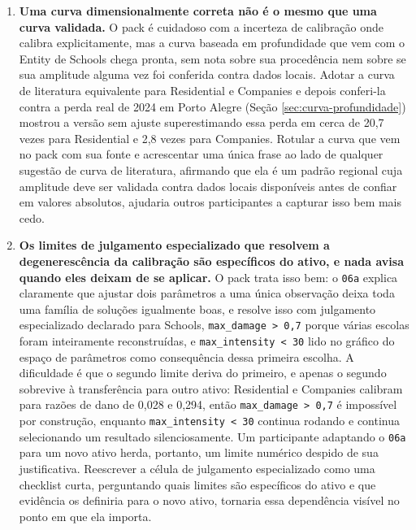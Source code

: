 \documentclass[11pt]{article}
\begin{document}
\begin{enumerate}
\item \textbf{Uma curva dimensionalmente correta não é o mesmo que uma curva validada.} O
pack é cuidadoso com a incerteza de calibração onde calibra explicitamente, mas a curva
baseada em profundidade que vem com o Entity de Schools chega pronta, sem nota sobre sua
procedência nem sobre se sua amplitude alguma vez foi conferida contra dados locais. Adotar
a curva de literatura equivalente para Residential e Companies e depois conferi-la contra a
perda real de 2024 em Porto Alegre (Seção \ref{sec:curva-profundidade}) mostrou a versão
sem ajuste superestimando essa perda em cerca de 20,7 vezes para Residential e 2,8 vezes
para Companies. Rotular a curva que vem no pack com sua fonte e acrescentar uma única frase
ao lado de qualquer sugestão de curva de literatura, afirmando que ela é um padrão regional
cuja amplitude deve ser validada contra dados locais disponíveis antes de confiar em
valores absolutos, ajudaria outros participantes a capturar isso bem mais cedo.

\item \textbf{Os limites de julgamento especializado que resolvem a degenerescência da
calibração são específicos do ativo, e nada avisa quando eles deixam de se aplicar.} O pack
trata isso bem: o \texttt{06a} explica claramente que ajustar dois parâmetros a uma única
observação deixa toda uma família de soluções igualmente boas, e resolve isso com
julgamento especializado declarado para Schools, \texttt{max\_damage > 0,7} porque várias
escolas foram inteiramente reconstruídas, e \texttt{max\_intensity < 30} lido no gráfico do
espaço de parâmetros como consequência dessa primeira escolha. A dificuldade é que o
segundo limite deriva do primeiro, e apenas o segundo sobrevive à transferência para outro
ativo: Residential e Companies calibram para razões de dano de 0,028 e 0,294, então
\texttt{max\_damage > 0,7} é impossível por construção, enquanto \texttt{max\_intensity <
30} continua rodando e continua selecionando um resultado silenciosamente. Um participante
adaptando o \texttt{06a} para um novo ativo herda, portanto, um limite numérico despido de
sua justificativa. Reescrever a célula de julgamento especializado como uma checklist
curta, perguntando quais limites são específicos do ativo e que evidência os definiria para
o novo ativo, tornaria essa dependência visível no ponto em que ela importa.


\end{enumerate}
\end{document}
